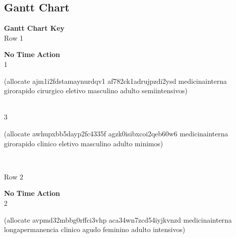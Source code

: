 \documentclass[a4paper,12pt]{article}
\newcommand{\action}[1]{{\sf #1}}
\newcommand{\listrowg}[1]{\begin{minipage}[t]{10cm} #1 \end{minipage}}
\begin{document}
\subsection{Gantt Chart}
{\bf Gantt Chart Key}\\
Row 1
\begin{tabbing}
{\bf No} \qquad \= {\bf Time} \qquad \= {\bf Action} \\
1  \> \listrowg{\action{(allocate ajm1i2fdstamaynurdqv1 af782ck1adrujpzdi2ysd medicinainterna girorapido cirurgico eletivo masculino adulto semiintensivos)}} \\
3  \> \listrowg{\action{(allocate awhupxbb5dayp2fc4335f agzk0isibxcoi2qeb60w6 medicinainterna girorapido clinico eletivo masculino adulto minimos)}} \\
\end{tabbing}
Row 2
\begin{tabbing}
{\bf No} \qquad \= {\bf Time} \qquad \= {\bf Action} \\
2  \> \listrowg{\action{(allocate avpmd32mbbg0rffci3vhp aca34wn7zcd54iyjkvnzd medicinainterna longapermanencia clinico agudo feminino adulto intensivos)}} \\
\end{tabbing}
\end{document}
